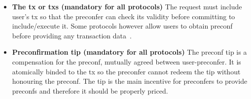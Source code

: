 \documentclass[conference]{IEEEtran}
\theoremstyle{boldstyle}
\begin{document}
    \begin{itemize}
        \item \textbf{The tx or txs (mandatory for all protocols)} The request must include user's tx so that the preconfer can check its validity before committing to include/execute it.
        Some protocols however allow users to obtain preconf before providing any transaction data~\cite{W:Proposer-CommitmentInfrastructureinEthereum}.
        \item \textbf{Preconfirmation tip (mandatory for all protocols)} The preconf tip is a compensation for the preconf, mutually agreed between user-preconfer. It is atomically binded to the tx so the preconfer cannot redeem the tip without honouring the preconf. The tip is the main incentive for preconfers to provide preconfs and therefore it should be properly priced. 
        

\end{itemize}
\end{document}
